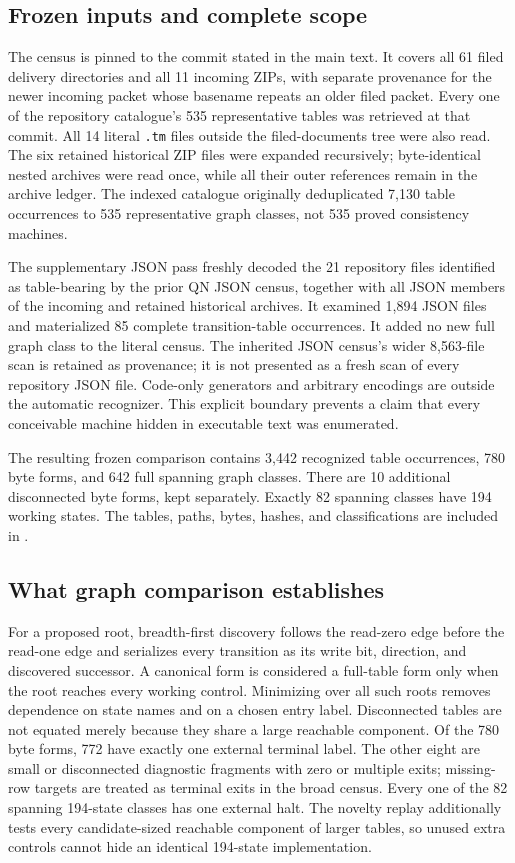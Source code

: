 \subsection{Frozen inputs and complete scope}
The census is pinned to the commit stated in the main text. It covers all
61 filed delivery directories and all 11 incoming ZIPs, with separate provenance
for the newer incoming packet whose basename repeats an older filed packet.
Every one of the repository catalogue's 535 representative tables was retrieved
at that commit. All 14 literal \texttt{.tm} files outside the filed-documents tree
were also read. The six retained historical ZIP files were expanded recursively;
byte-identical nested archives were read once, while all their outer references
remain in the archive ledger. The indexed catalogue originally deduplicated
7,130 table occurrences to 535 representative graph classes, not 535 proved
consistency machines.

The supplementary JSON pass freshly decoded the 21 repository files identified
as table-bearing by the prior QN JSON census, together with all JSON members
of the incoming and retained historical archives. It examined 1,894 JSON files
and materialized 85 complete transition-table occurrences. It added no new
full graph class to the literal census. The inherited JSON census's wider
8,563-file scan is retained as provenance; it is not presented as a fresh scan
of every repository JSON file. Code-only generators and arbitrary encodings
are outside the automatic recognizer. This explicit boundary prevents a
claim that every conceivable machine hidden in executable text was enumerated.

The resulting frozen comparison contains 3,442 recognized table occurrences, 780 byte forms, and 642 full spanning graph classes. There are 10 additional disconnected byte forms, kept separately. Exactly 82 spanning classes have 194 working states. The tables, paths, bytes, hashes, and classifications are included in .

\subsection{What graph comparison establishes}
For a proposed root, breadth-first discovery follows the read-zero edge before
the read-one edge and serializes every transition as its write bit, direction,
and discovered successor. A canonical form is considered a full-table form
only when the root reaches every working control. Minimizing over all such
roots removes dependence on state names and on a chosen entry label.
Disconnected tables are not equated merely because they share a large reachable
component. Of the 780 byte forms, 772 have exactly one external terminal label. The other
eight are small or disconnected diagnostic fragments with zero or multiple
exits; missing-row targets are treated as terminal exits in the broad census.
Every one of the 82 spanning 194-state classes has one external halt.
The novelty replay additionally tests every candidate-sized reachable
component of larger tables, so unused extra controls cannot hide an identical
194-state implementation.

